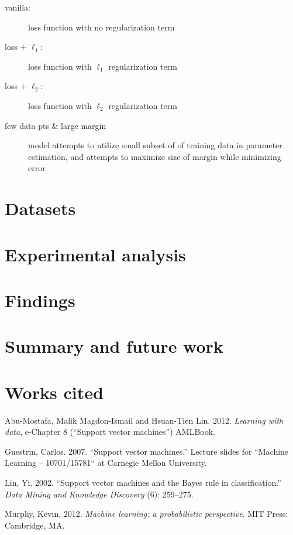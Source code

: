 \documentclass[letterpaper, 11pt]{article}
\begin{document}
\begin{description}
\item[vanilla:] loss function with no regularization term \\
\item[loss + $\ell_1$:] loss function with $\ell_1$ regularization term \\
\item[loss + $\ell_2$:] loss function with $\ell_2$ regularization term
\item[few data pts \& large margin] model attempts to utilize small subset of of training data in parameter estimation, and attempts to maximize size of margin while minimizing error 
\end{description}

\section{Datasets}

\section{Experimental analysis}

\section{Findings}

\section{Summary and future work}

\section{Works cited}

Abu-Mostafa, Malik Magdon-Ismail and Hsuan-Tien Lin. 2012. \emph{Learning with data}, e-Chapter 8 (``Support vector machines'') AMLBook.

Guestrin, Carlos. 2007. ``Support vector machines.'' Lecture slides for ``Machine Learning – 10701/15781`` at Carnegie Mellon University. 

Lin, Yi. 2002. ``Support vector machines and the Bayes rule in classification.'' \emph{Data Mining and Knowledge Discovery} (6): 259–275.

Murphy, Kevin. 2012. \emph{Machine learning: a probabilistic perspective}. MIT Press: Cambridge, MA.
\end{document}
